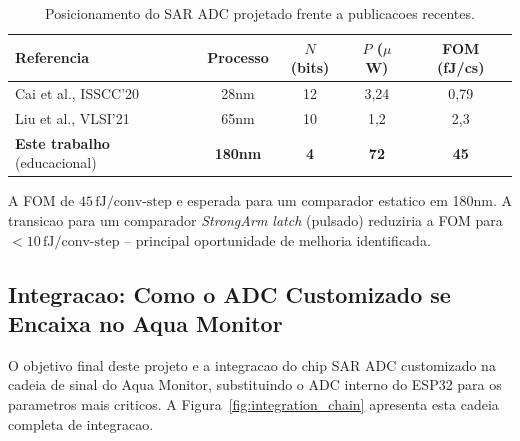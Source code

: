 \documentclass[12pt, a4paper]{article}
\begin{document}
\begin{table}[H]
\centering
\caption{Posicionamento do SAR ADC projetado frente a publicacoes recentes.}
\label{tab:soa}
\begin{tabular}{lcccc}
\toprule
\textbf{Referencia} & \textbf{Processo} & $N$ (bits) & $P$ ($\mu$W) & FOM (fJ/cs) \\
\midrule
Cai et al., ISSCC'20~\cite{isscc2020}    & 28nm  & 12 & 3,24  & 0,79 \\
Liu et al., VLSI'21~\cite{vlsi2021}      & 65nm  & 10 & 1,2   & 2,3  \\
\textbf{Este trabalho} (educacional)     & \textbf{180nm} & \textbf{4} & \textbf{72} & \textbf{45} \\
\bottomrule
\end{tabular}
\end{table}

A FOM de $45\,\text{fJ/conv-step}$ e esperada para um comparador estatico em 180nm. A
transicao para um comparador \textit{StrongArm latch} (pulsado) reduziria a FOM para
$<10\,\text{fJ/conv-step}$ -- principal oportunidade de melhoria identificada.

\subsection{Integracao: Como o ADC Customizado se Encaixa no Aqua Monitor}

O objetivo final deste projeto e a integracao do chip SAR ADC customizado na cadeia de sinal
do Aqua Monitor, substituindo o ADC interno do ESP32 para os parametros mais criticos.
A Figura~\ref{fig:integration_chain} apresenta esta cadeia completa de integracao.
\end{document}
